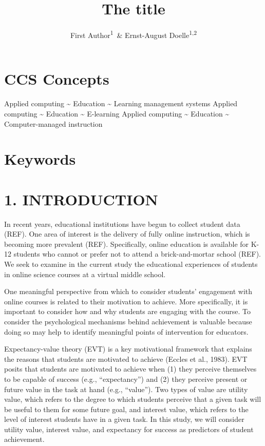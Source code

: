 \documentclass[]{apa6}
\title{The title}
\author{First Author\textsuperscript{1}~\& Ernst-August Doelle\textsuperscript{1,2}}
\affiliation{
    \vspace{0.5cm}
          \textsuperscript{1} Wilhelm-Wundt-University\\
          \textsuperscript{2} Konstanz Business School  }
\theoremstyle{definition}
\theoremstyle{definition}
\theoremstyle{definition}
\theoremstyle{remark}
\begin{document}
\maketitle

\setcounter{secnumdepth}{0}



\section{CCS Concepts}\label{ccs-concepts}

Applied computing \textasciitilde{} Education \textasciitilde{} Learning
management systems Applied computing \textasciitilde{} Education
\textasciitilde{} E-learning Applied computing \textasciitilde{}
Education \textasciitilde{} Computer-managed instruction

\section{Keywords}\label{keywords}

\section{1. INTRODUCTION}\label{introduction}

In recent years, educational institutions have begun to collect student
data (REF). One area of interest is the delivery of fully online
instruction, which is becoming more prevalent (REF). Specifically,
online education is available for K-12 students who cannot or prefer not
to attend a brick-and-mortar school (REF). We seek to examine in the
current study the educational experiences of students in online science
courses at a virtual middle school.

One meaningful perspective from which to consider students' engagement
with online courses is related to their motivation to achieve. More
specifically, it is important to consider how and why students are
engaging with the course. To consider the psychological mechanisms
behind achievement is valuable because doing so may help to identify
meaningful points of intervention for educators.

Expectancy-value theory (EVT) is a key motivational framework that
explains the reasons that students are motivated to achieve (Eccles et
al., 1983). EVT posits that students are motivated to achieve when (1)
they perceive themselves to be capable of success (e.g.,
\enquote{expectancy}) and (2) they perceive present or future value in
the task at hand (e.g., \enquote{value}). Two types of value are utility
value, which refers to the degree to which students perceive that a
given task will be useful to them for some future goal, and interest
value, which refers to the level of interest students have in a given
task. In this study, we will consider utility value, interest value, and
expectancy for success as predictors of student achievement.
\end{document}
